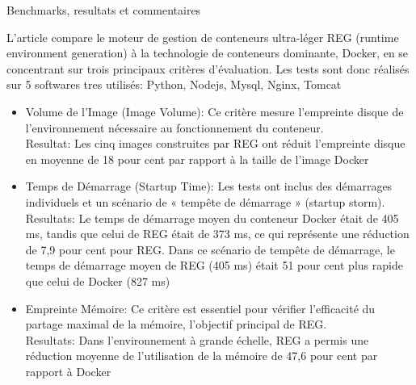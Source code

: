 \documentclass[9pt]{beamer}
\begin{document}
\begin{frame}{Benchmarks, resultats et commentaires}

L'article compare le moteur de gestion de conteneurs ultra-léger REG (runtime environment generation) à la technologie de conteneurs dominante, Docker, en se concentrant sur trois principaux critères d'évaluation. Les tests sont donc réalisés sur 5 softwares tres utilisés: Python, Nodejs, Mysql, Nginx, Tomcat
\begin{itemize}
    \item Volume de l'Image (Image Volume): Ce critère mesure l'empreinte disque de l'environnement nécessaire au fonctionnement du conteneur.\\ Resultat: Les cinq images construites par REG ont réduit l'empreinte disque en moyenne de 18  pour cent par rapport à la taille de l'image Docker
    \item  Temps de Démarrage (Startup Time): Les tests ont inclus des démarrages individuels et un scénario de « tempête de démarrage » (startup storm).\\ Resultats: Le temps de démarrage moyen du conteneur Docker était de 405 ms, tandis que celui de REG était de 373 ms, ce qui représente une réduction de 7,9 pour cent pour REG. Dans ce scénario de tempête de démarrage, le temps de démarrage moyen de REG (405 ms) était 51 pour cent plus rapide que celui de Docker (827 ms) 
    \item Empreinte Mémoire: Ce critère est essentiel pour vérifier l'efficacité du partage maximal de la mémoire, l'objectif principal de REG.\\Resultats: Dans l'environnement à grande échelle, REG a permis une réduction moyenne de l'utilisation de la mémoire de 47,6 pour cent par rapport à Docker
\end{itemize}
\end{frame}




\end{document}
